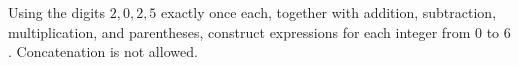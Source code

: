 Using the digits $2,0,2,5$ exactly once each, together with addition, subtraction, multiplication, and parentheses, construct expressions for each integer from $0$ to $6$. Concatenation is not allowed.
